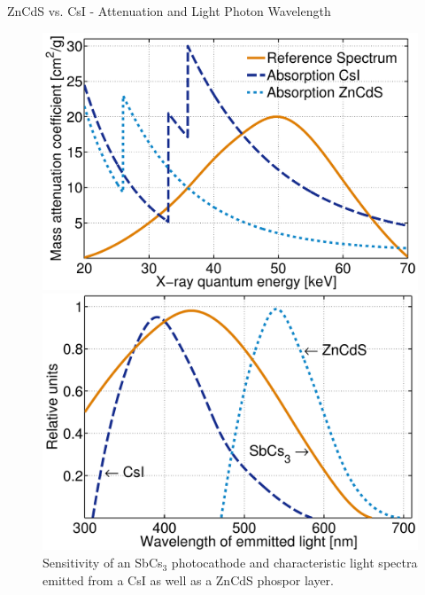 \begin{frame}{ZnCdS vs. CsI - Attenuation and Light Photon Wavelength}
    \begin{figure}[tb]%
        \centering
        \begin{minipage}[c]{0.47\columnwidth}
            \includegraphics[width=1\columnwidth]{images/AbsorptionPhosphorMaterial}%
            \caption{Mass attenuation coefficient of CsI and ZnCdS and the estimated X-ray spectrum after transmission through the patient.}
        \end{minipage}
        \hspace{0.5cm}
        \begin{minipage}[c]{0.47\columnwidth}
            \includegraphics[width=1\columnwidth]{images/SensitivityPhosphorPhotocathode}%
            \caption{Sensitivity of an SbCs$_3$ photocathode and characteristic light spectra emitted from a CsI as well as a ZnCdS phospor layer.}
        \end{minipage}%
    \end{figure}
\end{frame}

